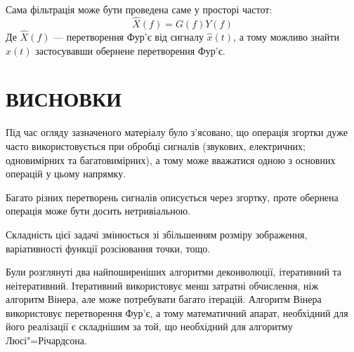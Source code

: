 \documentclass[simple,14pt,utf8,ukrainian]{eskdtext}
\begin{document}
    Сама фільтрація може бути проведена саме у просторі частот:
    \[
      \hat{X}(f) = G(f)Y(f)
    \]
    Де $\hat{X}(f)$ --- перетворення Фур’є від сигналу $\hat{x}(t)$, а тому
    можливо знайти $\hat{x}(t)$ застосувавши обернене перетворення Фур’є.
    \clearpage

    \section{ВИСНОВКИ}
    Під час огляду зазначеного матеріалу було з’ясовано, що операція згортки
    дуже часто використовується при обробці сигналів (звукових, електричних;
    одновимірних та багатовимірних), а тому може вважатися одною з основних
    операцій у цьому напрямку.

    Багато різних перетворень сигналів описується через згортку, проте
    обернена операція може бути досить нетривіальною.

    Складність цієї задачі змінюється зі збільшенням розміру зображення,
    варіативності функції розсіювання точки, тощо.

    Були розглянуті два найпоширеніших алгоритми деконволюції, ітеративний та
    неітеративний.
    Ітеративний використовує менш затратні обчислення, ніж алгоритм Вінера,
    але може потребувати багато ітерацій.
    Алгоритм Вінера використовує перетворення Фур’є, а тому математичний
    апарат, необхідний для його реалізації є складнішим за той, що необхідний
    для алгоритму Люсі"=Річардсона.




\end{document}
